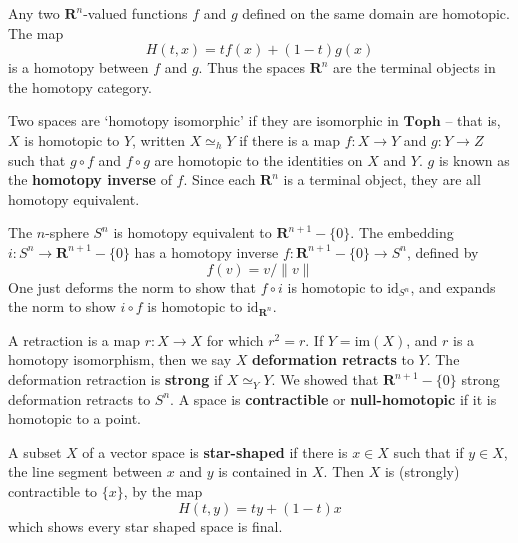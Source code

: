 \begin{example}
    Any two $\mathbf{R}^n$-valued functions $f$ and $g$ defined on the same domain are homotopic. The map
    \[ H(t,x) = t f(x) + (1 - t) g(x) \]
    is a homotopy between $f$ and $g$. Thus the spaces $\mathbf{R}^n$ are the terminal objects in the homotopy category.
\end{example}

Two spaces are `homotopy isomorphic' if they are isomorphic in $\textbf{Toph}$ -- that is, $X$ is homotopic to $Y$, written $X \simeq_h Y$ if there is a map $f:X \to Y$ and $g: Y \to Z$ such that $g \circ f$ and $f \circ g$ are homotopic to the identities on $X$ and $Y$. $g$ is known as the {\bf homotopy inverse} of $f$. Since each $\mathbf{R}^n$ is a terminal object, they are all homotopy equivalent.

\begin{example}
    The $n$-sphere $S^n$ is homotopy equivalent to $\mathbf{R}^{n+1} - \{ 0 \}$. The embedding $i: S^n \to \mathbf{R}^{n+1} - \{ 0 \}$ has a homotopy inverse $f: \mathbf{R}^{n+1} - \{ 0 \} \to S^n$, defined by
    \[ f(v) = v/\|v\| \]
    One just deforms the norm to show that $f \circ i$ is homotopic to $\text{id}_{S^n}$, and expands the norm to show $i \circ f$ is homotopic to $\text{id}_{\mathbf{R}^n}$.
\end{example}

A retraction is a map $r:X \to X$ for which $r^2 = r$. If $Y = \text{im}(X)$, and $r$ is a homotopy isomorphism, then we say $X$ {\bf deformation retracts} to $Y$. The deformation retraction is {\bf strong} if $X \simeq_Y Y$. We showed that $\mathbf{R}^{n+1} - \{ 0 \}$ strong deformation retracts to $S^n$. A space is {\bf contractible} or {\bf null-homotopic} if it is homotopic to a point.

\begin{example}
    A subset $X$ of a vector space is {\bf star-shaped} if there is $x \in X$ such that if $y \in X$, the line segment between $x$ and $y$ is contained in $X$. Then $X$ is (strongly) contractible to $\{ x \}$, by the map
    \[ H(t,y) = ty + (1 - t)x \]
    which shows every star shaped space is final.
\end{example}

